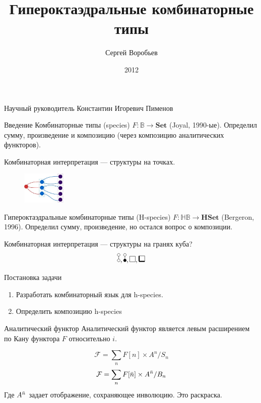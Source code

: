 \documentclass{beamer}
\title{Гипероктаэдральные комбинаторные типы}
\author{Сергей Воробьев}
\institute{Санкт-Петербургский Государственный университет}
\date{2012}
\begin{document}
\begin{frame}
\titlepage
\begin{center}
\begin{small}
Научный руководитель Константин Игоревич Пименов
\end{small}
\end{center}
\end{frame}


\begin{frame}{Введение}
Комбинаторные типы (species) $F\colon \mathbb{B} \rightarrow
\mathbf{Set}$ (Joyal, 1990-ые). Определил сумму, произведение и композицию
(через композицию аналитических функторов).

Комбинаторная интерпретация --- структуры на точках.
\begin{figure}
   \includegraphics[height=15mm]{species.jpg}
\end{figure}

Гипероктаэдральные комбинаторные типы
(H-species) $F\colon \mathbb{HB} \rightarrow \mathbf{HSet}$ (Bergeron, 1996).
Определил сумму, произведение, но остался вопрос о композиции.

Комбинаторная интерпретация --- структуры на гранях куба?
$$
\dA, \dB, \dAA, \dBB
$$
\end{frame}

\begin{frame}{Постановка задачи}
\begin{enumerate}[*]
\item Разработать комбинаторный язык для h-species.
\item Определить композицию h-species
\end{enumerate}
\end{frame}

\begin{frame}{Аналитический функтор}
Аналитический функтор является левым расширением по Кану функтора $F$
относительно $i$.
\begin{center}
\end{center}
$$
\mathcal F = \sum\limits_n F[n] \times A^{n} / S_n
$$                   
$$
\mathcal F = \sum\limits_n F[\Bar n] \times A^{\Bar n} / B_n
$$
Где $A^{\Bar n}$ задает отображение, сохраняющее инволюцию. Это раскраска.
\end{frame}
\end{document}

